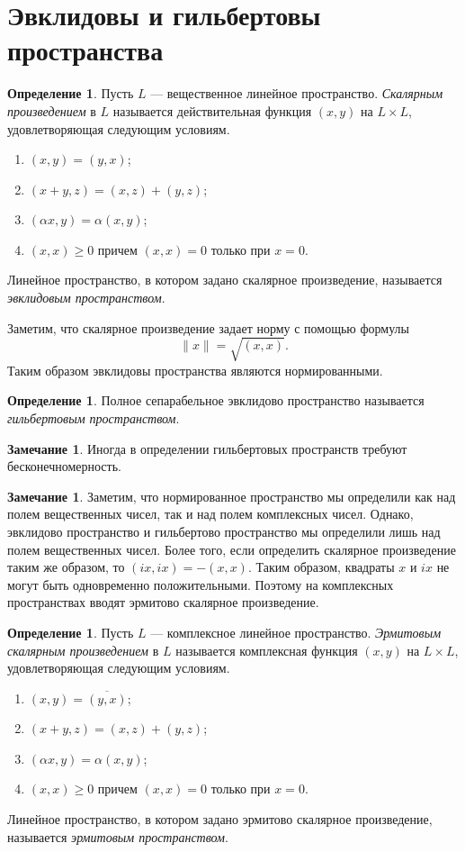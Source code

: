 \documentclass[12pt, titlepage, oneside]{amsbook}
\theoremstyle{definition}
\newtheorem{definition}[theorem]{Определение}
\newtheorem{remark}[theorem]{Замечание}
\theoremstyle{remark}
\begin{document}
\section{Эвклидовы и гильбертовы пространства}


\begin{definition}
	Пусть $L$ --- вещественное линейное пространство. \emph{Скалярным произведением} в $L$ называется действительная функция $(x,y)$ на $L\times L$, удовлетворяющая следующим условиям.
	\begin{enumerate}
		\item $(x,y)=(y,x)$;
		\item $(x+y,z)=(x,z)+(y,z)$;
		\item $(\alpha x,y)=\alpha (x,y)$;
		\item $(x,x)\geq 0$ причем $(x,x)=0$ только при $x=0$.
	\end{enumerate}
	Линейное пространство, в котором задано скалярное произведение, называется \emph{эвклидовым пространством}.
\end{definition}

Заметим, что скалярное произведение задает норму с помощью формулы $$\|x\|=\sqrt{(x,x)}.$$ Таким образом эвклидовы пространства являются нормированными.

\begin{definition}
	Полное сепарабельное эвклидово пространство называется \emph{гильбертовым пространством}.
\end{definition}

\begin{remark}
	Иногда в определении гильбертовых пространств требуют бесконечномерность.
\end{remark}

\begin{remark}
	Заметим, что нормированное пространство мы определили как над полем вещественных чисел, так и над полем комплексных чисел. Однако, эвклидово пространство и гильбертово пространство мы определили лишь над полем вещественных чисел. Более того, если определить скалярное произведение таким же образом, то $(ix,ix)=-(x,x)$. Таким образом, квадраты $x$ и $ix$ не могут быть одновременно положительными. Поэтому на комплексных пространствах вводят эрмитово скалярное произведение.
\end{remark}

\begin{definition}
	Пусть $L$ --- комплексное линейное пространство. \emph{Эрмитовым скалярным произведением} в $L$ называется комплексная функция $(x,y)$ на $L\times L$, удовлетворяющая следующим условиям.
	\begin{enumerate}
		\item $(x,y)=\overline{(y,x)}$;
		\item $(x+y,z)=(x,z)+(y,z)$;
		\item $(\alpha x,y)=\alpha (x,y)$;
		\item $(x,x)\geq 0$ причем $(x,x)=0$ только при $x=0$.
	\end{enumerate}
	Линейное пространство, в котором задано эрмитово скалярное произведение, называется \emph{эрмитовым пространством}.
\end{definition}
\end{document}
